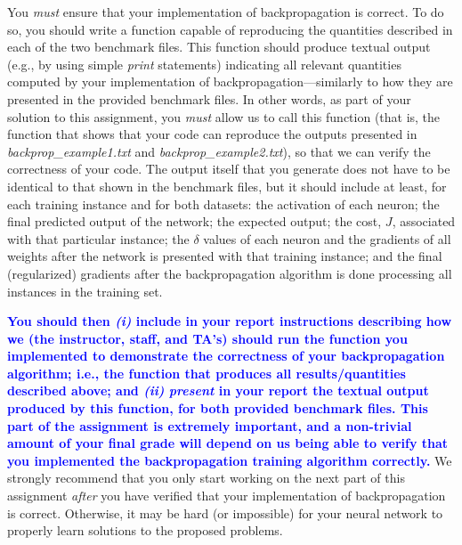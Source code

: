 \documentclass[letterpaper]{article}
\newcommand{\HIGHLIGHT}[1]{\textcolor{blue}{\textbf{#1}}}
\begin{document}
You \textit{must} ensure that your implementation of backpropagation is correct. To do so, you should write a function capable of reproducing the quantities described in each of the two benchmark files. This function should produce textual output (e.g., by using simple \textit{print} statements) indicating all relevant quantities computed by your implementation of backpropagation---similarly to how they are presented in the provided benchmark files. In other words, as part of your solution to this assignment, you \textit{must} allow us to call this function (that is, the function that shows that your code can reproduce the outputs presented in \emph{backprop\_example1.txt} and \emph{backprop\_example2.txt}), so that we can verify the correctness of your code. The output itself that you generate does not have to be identical to that shown in the benchmark files, but it should include at least, for each training instance and for both datasets: the activation of each neuron; the final predicted output of the network; the expected output; the cost, $J$, associated with that particular instance; the $\delta$ values of each neuron and the gradients of all weights after the network is presented with that training instance; and the final (regularized) gradients after the backpropagation algorithm is done processing all instances in the training set.

\HIGHLIGHT{You should then \textit{(i)} include in your report instructions describing how we (the instructor, staff, and TA's) should run the function you implemented to demonstrate the correctness of your backpropagation algorithm; i.e., the function that produces all results/quantities described above; and \textit{(ii)} \textit{present} in your report the textual output produced by this function, for both provided benchmark files. This part of the assignment is extremely important, and a non-trivial amount of your final grade will depend on us being able to verify that you implemented the backpropagation training algorithm correctly.} We strongly recommend that you only start working on the next part of this assignment \textit{after} you have verified that your implementation of backpropagation is correct. Otherwise, it may be hard (or impossible) for your neural network to properly learn solutions to the proposed problems. 
\end{document}

